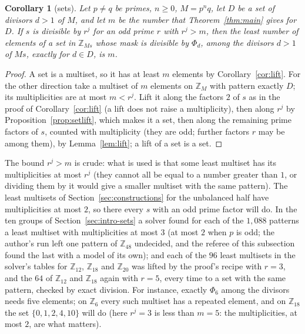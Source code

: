\documentclass[11pt,a4paper]{amsart}
\newtheorem{corollary}[theorem]{Corollary}
\theoremstyle{definition}
\theoremstyle{remark}
\newcommand{\Z}{\mathbb{Z}}
\begin{document}
\begin{corollary}[sets]\label{cor:sets}
Let $p\ne q$ be primes, $n\ge0$, $M=p^nq$, let $D$ be a set of divisors $d>1$ of $M$, and let $m$ be the number
that Theorem~\ref{thm:main} gives for $D$. If $s$ is divisible by $r^j$ for an odd prime $r$ with $r^j>m$, then
the least number of elements of a \emph{set} in $\Z_{Ms}$ whose mask is divisible by $\Phi_d$, among the divisors
$d>1$ of $Ms$, exactly for $d\in D$, is $m$.
\end{corollary}
\begin{proof}
A set is a multiset, so it has at least $m$ elements by Corollary~\ref{cor:lift}. For the other direction take a
multiset of $m$ elements on $\Z_M$ with pattern exactly $D$; its multiplicities are at most $m<r^j$. Lift it along
the factors $2$ of $s$ as in the proof of Corollary~\ref{cor:lift} (a lift does not raise a multiplicity), then along
$r^j$ by Proposition~\ref{prop:setlift}, which makes it a set, then along the remaining prime factors of $s$, counted
with multiplicity (they are odd; further factors $r$ may be among them), by Lemma~\ref{lem:lift}; a lift of a set is a set.
\end{proof}

The bound $r^j>m$ is crude: what is used is that some least multiset has its multiplicities at most $r^j$ (they
cannot all be equal to a number greater than $1$, or dividing them by it would give a smaller multiset with the
same pattern). The least multisets of Section~\ref{sec:constructions} for the unbalanced half have multiplicities at
most $2$, so there every $s$ with an odd prime factor will do. In the ten groups of Section~\ref{sec:intro-sets} a solver
found for each of the $1{,}088$ patterns a least multiset with multiplicities at most $3$ (at most $2$ when
$p$ is odd; the author's run left one pattern of $\Z_{48}$ undecided, and the referee of this subsection found the last with a model of its own); and each of the $96$ least multisets in the solver's tables for
$\Z_{12}$, $\Z_{18}$ and $\Z_{20}$ was lifted by the proof's recipe with $r=3$, and the $64$ of $\Z_{12}$ and $\Z_{18}$ again with $r=5$, every time to a set with the same
pattern, checked by exact division. For instance, exactly $\Phi_6$ among the divisors needs five elements; on $\Z_6$ every such
multiset has a repeated element, and on $\Z_{18}$ the set $\{0,1,2,4,10\}$ will do (here $r^j=3$ is less than $m=5$: the multiplicities, at most $2$, are what matters).
\end{document}
